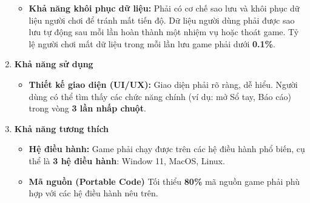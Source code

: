 \begin{enumerate}
\begin{itemize}
        \item \textbf{Khả năng khôi phục dữ liệu:}
        Phải có cơ chế sao lưu và khôi phục dữ liệu người chơi để tránh mất tiến độ. Dữ liệu người dùng phải được sao lưu tự động sau mỗi lần hoàn thành một nhiệm vụ hoặc thoát game. Tỷ lệ người chơi mất dữ liệu trong mỗi lần lưu game phải dưới \textbf{0.1\%}.
    \end{itemize}

    \item \textbf{Khả năng sử dụng}
    \begin{itemize}
        \item \textbf{Thiết kế giao diện (UI/UX):}
        Giao diện phải rõ ràng, dễ hiểu. Người dùng có thể tìm thấy các chức năng chính (ví dụ: mở Sổ tay, Báo cáo) trong vòng \textbf{3 lần nhấp chuột}.
    \end{itemize}

    \item \textbf{Khả năng tương thích}
    \begin{itemize}
        \item \textbf{Hệ điều hành:} Game phải chạy được trên các hệ điều hành phổ biến, cụ thể là \textbf{3 hệ điều hành}: Window 11, MacOS, Linux.

        \item \textbf{Mã nguồn (Portable Code)} Tối thiểu \textbf{80\%} mã nguồn game phải phù hợp với các hệ điều hành nêu trên.
    \end{itemize}


\end{enumerate}


